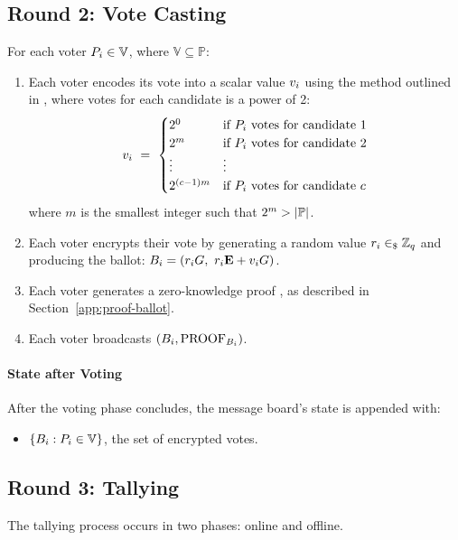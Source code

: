 \documentclass[lettersize,journal]{IEEEtran}
\theoremstyle{definition}
\begin{document}
\subsection{Round 2: Vote Casting}

For each voter $P_{i} \in \mathbb{V}$, where $\mathbb{V} \subseteq  \mathbb{P}$:
\begin{enumerate}
     \item Each voter encodes its vote into a scalar value $v_{i}$ using the method outlined in \cite{baudronPracticalMulticandidateElection2001}, where votes for each candidate is a power of 2: \[ v_{i}\ =\ \begin{cases} 2^0 & \text{if } P_{i} \text{ votes for candidate 1} \\ 2^m & \text{if } P_{i} \text{ votes for candidate 2} \\ \vdots & \vdots \\ 2^{(c-1)m} & \text{if } P_{i} \text{ votes for candidate $c$}\end{cases}\]
where $m$ is the smallest integer such that $2^m > |\mathbb{P}|$.
    \item Each voter encrypts their vote by generating a random value $r_{i} \in_{\$} \mathbb{Z}_q$ and producing the ballot: $B_{i} = (r_{i} G,\ r_{i} \textbf{E}{} + v_{i} G)$.
   \item Each voter generates a zero-knowledge proof , as described in Section~\ref{app:proof-ballot}.
    \item Each voter broadcasts $(B_{i}, \textrm{PROOF}_{\textrm{\ensuremath{B_{i}}}})$.
\end{enumerate}
\paragraph{State after Voting}

After the voting phase concludes, the message board's state is appended with:
\begin{itemize}
    \item $\{B_{i} : P_{i} \in \mathbb{V}\}$, the set of encrypted votes.
\end{itemize}

\subsection{Round 3: Tallying}

The tallying process occurs in two phases: online and offline.
\end{document}
